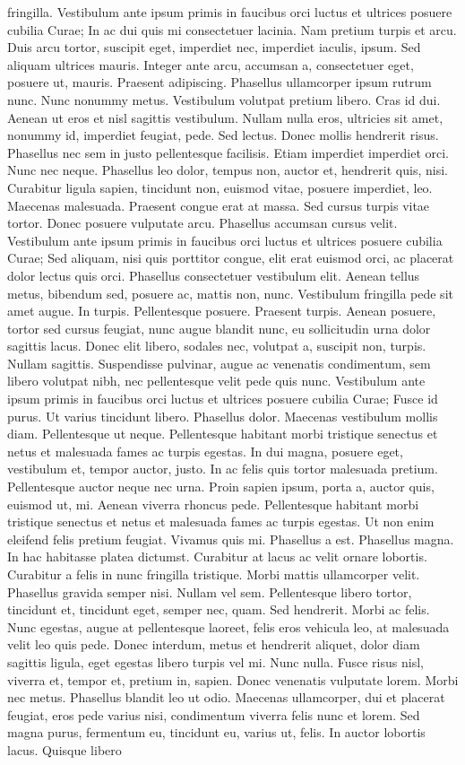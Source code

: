 fringilla. Vestibulum ante ipsum primis in faucibus orci luctus et ultrices posuere cubilia Curae; In ac dui quis mi consectetuer lacinia. Nam pretium turpis et arcu. Duis arcu tortor, suscipit eget, imperdiet nec, imperdiet iaculis, ipsum. Sed aliquam ultrices mauris. Integer ante arcu, accumsan a, consectetuer eget, posuere ut, mauris. Praesent adipiscing. Phasellus ullamcorper ipsum rutrum nunc. Nunc nonummy metus. Vestibulum volutpat pretium libero. Cras id dui. Aenean ut eros et nisl sagittis vestibulum. Nullam nulla eros, ultricies sit amet, nonummy id, imperdiet feugiat, pede. Sed lectus. Donec mollis hendrerit risus. Phasellus nec sem in justo pellentesque facilisis. Etiam imperdiet imperdiet orci. Nunc nec neque. Phasellus leo dolor, tempus non, auctor et, hendrerit quis, nisi. Curabitur ligula sapien, tincidunt non, euismod vitae, posuere imperdiet, leo. Maecenas malesuada. Praesent congue erat at massa. Sed cursus turpis vitae tortor. Donec posuere vulputate arcu. Phasellus accumsan cursus velit. Vestibulum ante ipsum primis in faucibus orci luctus et ultrices posuere cubilia Curae; Sed aliquam, nisi quis porttitor congue, elit erat euismod orci, ac placerat dolor lectus quis orci. Phasellus consectetuer vestibulum elit. Aenean tellus metus, bibendum sed, posuere ac, mattis non, nunc. Vestibulum fringilla pede sit amet augue. In turpis. Pellentesque posuere. Praesent turpis. Aenean posuere, tortor sed cursus feugiat, nunc augue blandit nunc, eu sollicitudin urna dolor sagittis lacus. Donec elit libero, sodales nec, volutpat a, suscipit non, turpis. Nullam sagittis. Suspendisse pulvinar, augue ac venenatis condimentum, sem libero volutpat nibh, nec pellentesque velit pede quis nunc. Vestibulum ante ipsum primis in faucibus orci luctus et ultrices posuere cubilia Curae; Fusce id purus. Ut varius tincidunt libero. Phasellus dolor. Maecenas vestibulum mollis diam. Pellentesque ut neque. Pellentesque habitant morbi tristique senectus et netus et malesuada fames ac turpis egestas. In dui magna, posuere eget, vestibulum et, tempor auctor, justo. In ac felis quis tortor malesuada pretium. Pellentesque auctor neque nec urna. Proin sapien ipsum, porta a, auctor quis, euismod ut, mi. Aenean viverra rhoncus pede. Pellentesque habitant morbi tristique senectus et netus et malesuada fames ac turpis egestas. Ut non enim eleifend felis pretium feugiat. Vivamus quis mi. Phasellus a est. Phasellus magna. In hac habitasse platea dictumst. Curabitur at lacus ac velit ornare lobortis. Curabitur a felis in nunc fringilla tristique. Morbi mattis ullamcorper velit. Phasellus gravida semper nisi. Nullam vel sem. Pellentesque libero tortor, tincidunt et, tincidunt eget, semper nec, quam. Sed hendrerit. Morbi ac felis. Nunc egestas, augue at pellentesque laoreet, felis eros vehicula leo, at malesuada velit leo quis pede. Donec interdum, metus et hendrerit aliquet, dolor diam sagittis ligula, eget egestas libero turpis vel mi. Nunc nulla. Fusce risus nisl, viverra et, tempor et, pretium in, sapien. Donec venenatis vulputate lorem. Morbi nec metus. Phasellus blandit leo ut odio. Maecenas ullamcorper, dui et placerat feugiat, eros pede varius nisi, condimentum viverra felis nunc et lorem. Sed magna purus, fermentum eu, tincidunt eu, varius ut, felis. In auctor lobortis lacus. Quisque libero 